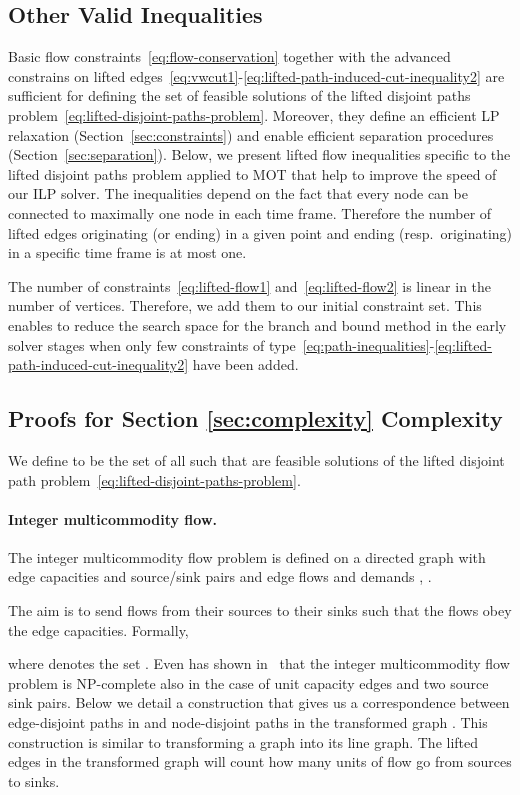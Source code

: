 \documentclass{article}
\begin{document}
\subsection{Other Valid Inequalities}
Basic flow constraints~\eqref{eq:flow-conservation} together with the advanced constrains on lifted edges~\eqref{eq:vwcut1}-\eqref{eq:lifted-path-induced-cut-inequality2} are sufficient for defining the set of feasible solutions of the lifted disjoint paths problem~\eqref{eq:lifted-disjoint-paths-problem}. Moreover, they define an efficient LP relaxation (Section~\ref{sec:constraints}) and enable efficient separation procedures (Section~\ref{sec:separation}). 
Below, we present lifted flow inequalities specific to the lifted disjoint paths problem applied to MOT that help to improve the speed of our ILP solver.
The inequalities depend on the fact that every node can be connected to maximally one node in each time frame.
Therefore the number of lifted edges originating (or ending) in a given point and ending (resp.\ originating) in a specific time frame is at most one.


The number of constraints~\eqref{eq:lifted-flow1} and~\eqref{eq:lifted-flow2} is linear in the number of vertices. Therefore, we add them to our initial constraint set. This enables to reduce the search space for the branch and bound method in the early solver stages when only few constraints of type~\eqref{eq:path-inequalities}-\eqref{eq:lifted-path-induced-cut-inequality2} have been added.

 \subsection{Proofs for Section \ref{sec:complexity} Complexity}
\label{sec:appendix-complexity}
We define  to be the set of all  such that  are feasible solutions of the lifted disjoint path problem~\eqref{eq:lifted-disjoint-paths-problem}.
\paragraph{Integer multicommodity flow.}

The integer multicommodity flow problem is defined on a directed graph  with edge capacities  and source/sink pairs  and edge flows  and demands , .

The aim is to send  flows from their sources to their sinks such that the flows obey the edge capacities. Formally,

where  denotes the set .
Even has shown in~\cite{EvenMulti} that the integer multicommodity flow problem is NP-complete also in the case of unit capacity edges and two source sink pairs.
Below we detail a construction that gives us a correspondence between edge-disjoint paths in   and node-disjoint paths in the transformed graph .
This construction is similar to transforming a graph into its line graph.
The lifted edges in the transformed graph will count how many units of flow go from sources to sinks.
\end{document}
